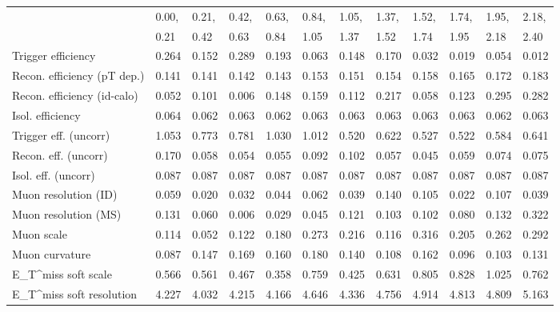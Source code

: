 \begin{tabular}{l|p{0.6cm}p{0.6cm}p{0.6cm}p{0.6cm}p{0.6cm}p{0.6cm}p{0.6cm}p{0.6cm}p{0.6cm}p{0.6cm}p{0.6cm}}
\hline
   & 0.00, & 0.21, & 0.42, & 0.63, & 0.84, & 1.05, & 1.37, & 1.52, & 1.74, & 1.95, & 2.18,  \\ 
   & 0.21 & 0.42 & 0.63 & 0.84 & 1.05 & 1.37 & 1.52 & 1.74 & 1.95 & 2.18 & 2.40  \\ 
\hline
Trigger efficiency                       & 0.264 & 0.152 & 0.289 & 0.193 & 0.063 & 0.148 & 0.170 & 0.032 & 0.019 & 0.054 & 0.012 \\
Recon. efficiency (pT dep.)              & 0.141 & 0.141 & 0.142 & 0.143 & 0.153 & 0.151 & 0.154 & 0.158 & 0.165 & 0.172 & 0.183 \\
Recon. efficiency (id-calo)              & 0.052 & 0.101 & 0.006 & 0.148 & 0.159 & 0.112 & 0.217 & 0.058 & 0.123 & 0.295 & 0.282 \\
Isol. efficiency                         & 0.064 & 0.062 & 0.063 & 0.062 & 0.063 & 0.063 & 0.063 & 0.063 & 0.063 & 0.062 & 0.063 \\
Trigger eff. (uncorr)                    & 1.053 & 0.773 & 0.781 & 1.030 & 1.012 & 0.520 & 0.622 & 0.527 & 0.522 & 0.584 & 0.641 \\
Recon. eff. (uncorr)                     & 0.170 & 0.058 & 0.054 & 0.055 & 0.092 & 0.102 & 0.057 & 0.045 & 0.059 & 0.074 & 0.075 \\
Isol. eff. (uncorr)                      & 0.087 & 0.087 & 0.087 & 0.087 & 0.087 & 0.087 & 0.087 & 0.087 & 0.087 & 0.087 & 0.087 \\
Muon resolution (ID)                     & 0.059 & 0.020 & 0.032 & 0.044 & 0.062 & 0.039 & 0.140 & 0.105 & 0.022 & 0.107 & 0.039 \\
Muon resolution (MS)                     & 0.131 & 0.060 & 0.006 & 0.029 & 0.045 & 0.121 & 0.103 & 0.102 & 0.080 & 0.132 & 0.322 \\
Muon scale                               & 0.114 & 0.052 & 0.122 & 0.180 & 0.273 & 0.216 & 0.116 & 0.316 & 0.205 & 0.262 & 0.292 \\
Muon curvature                           & 0.087 & 0.147 & 0.169 & 0.160 & 0.180 & 0.140 & 0.108 & 0.162 & 0.096 & 0.103 & 0.131 \\
E_{T}^{miss} soft scale                  & 0.566 & 0.561 & 0.467 & 0.358 & 0.759 & 0.425 & 0.631 & 0.805 & 0.828 & 1.025 & 0.762 \\
E_{T}^{miss} soft resolution             & 4.227 & 4.032 & 4.215 & 4.166 & 4.646 & 4.336 & 4.756 & 4.914 & 4.813 & 4.809 & 5.163 \\

\end{tabular}

